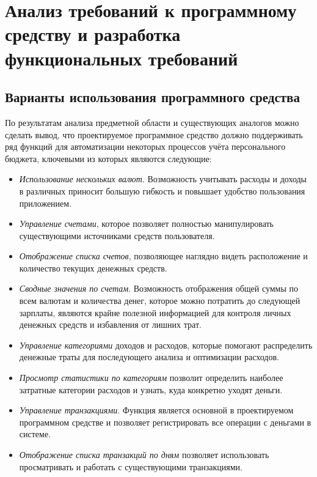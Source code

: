 \section{Анализ требований к программному средству и разработка функциональных требований}
\label{sec:domain}

\subsection{Варианты использования программного средства}
\label{sec:domain:use_cases}

По результатам анализа предметной области и существующих аналогов можно сделать вывод, что проектируемое программное средство должно поддерживать ряд функций для автоматизации некоторых процессов учёта персонального бюджета, ключевыми из которых являются следующие:

\begin{itemize}
    \item \emph{Использование нескольких валют}.
    Возможность учитывать расходы и доходы в различных приносит большую гибкость и повышает удобство пользования приложением.
    \item \emph{Управление счетами}, которое позволяет полностью манипулировать существующими источниками средств пользователя.
    \item \emph{Отображение списка счетов}, позволяющее наглядно видеть расположение и количество текущих денежных средств.
    \item \emph{Сводные значения по счетам}.
    Возможность отображения общей суммы по всем валютам и количества денег, которое можно потратить до следующей зарплаты, являются крайне полезной информацией для контроля личных денежных средств и избавления от лишних трат.
    \item \emph{Управление категориями} доходов и расходов, которые помогают распределить денежные траты для последующего анализа и оптимизации расходов.
    \item \emph{Просмотр статистики по категориям} позволит определить наиболее затратные категории расходов и узнать, куда конкретно уходят деньги.
    \item \emph{Управление транзакциями}.
    Функция является основной в проектируемом программном средстве и позволяет регистрировать все операции с деньгами в системе.
    \item \emph{Отображение списка транзакций по дням} позволяет использовать просматривать и работать с существующими транзакциями.
\end{itemize}

